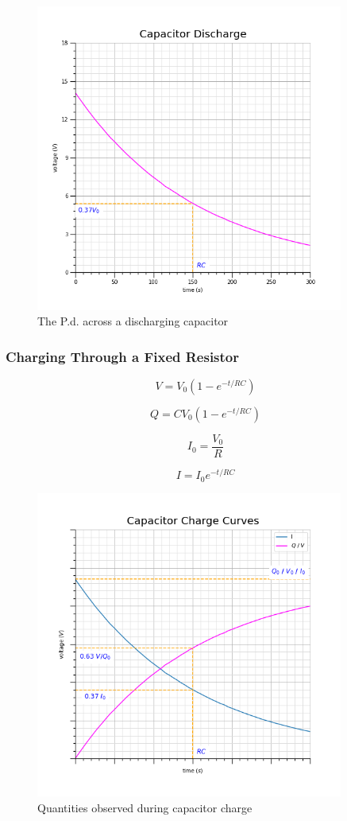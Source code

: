 \documentclass[12pt]{article}
\begin{document}
\begin{figure}[H]
\centering
\includegraphics[width=0.9\textwidth,keepaspectratio]{./images/capacitor_exp_discharge.png}
\caption{The P.d. across a discharging capacitor}
\end{figure}

\subsubsection{Charging Through a Fixed Resistor}
\label{sec:org039ee54}

\[V = V_0 \left ( 1 - e^{-t/RC} \right )\]

\[Q = CV_0 \left ( 1 - e^{-t/RC} \right )\]

\[I_0 = \dfrac{V_0}{R}\]

\[I = I_0 e^{-t/RC}\]

\begin{figure}[H]
\centering
\includegraphics[width=0.9\textwidth,keepaspectratio]{./images/capacitor_exp_charge.png}
\caption{Quantities observed during capacitor charge}
\end{figure}
\end{document}
